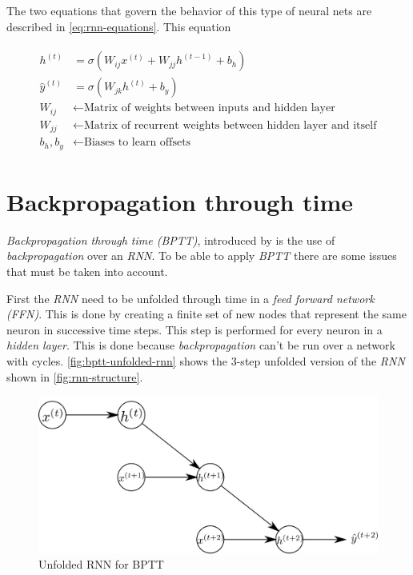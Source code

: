 The two equations that govern the behavior of this type of neural nets
are described in \autoref{eq:rnn-equations}. This equation

\begin{align}
  \begin{split}
    \label{eq:rnn-equations}
    h^{(t)} & = \sigma(W_{ij} x^{(t)} + W_{jj} h^{(t-1)} + b_h ) \\
    \hat{y}^{(t)} & = \sigma(W_{jk} h^{(t)} + b_y ) \\
    W_{ij} & \gets \text{Matrix of weights between inputs and hidden
      layer} \\
    W_{jj} & \gets \text{Matrix of recurrent weights between hidden
      layer and itself} \\
    b_h, b_y & \gets \text{Biases to learn offsets}
  \end{split}
\end{align}

\section{Backpropagation through time}
\label{sec:bp-through-time}

\textit{Backpropagation through time (BPTT)}, introduced by
\cite{werbos1990backpropagation} is the use of
\textit{backpropagation} over an \textit{RNN}. To be able to apply
\textit{BPTT} there are some issues that must be taken into account.

First the \textit{RNN} need to be unfolded through time in a
\textit{feed forward network (FFN)}. This is done by creating a finite
set of new nodes that represent the same neuron in successive time
steps. This step is performed for every neuron in a \textit{hidden
layer}. This is done because \textit{backpropagation} can't be run
over a network with cycles. \autoref{fig:bptt-unfolded-rnn} shows the
3-step unfolded version of the \textit{RNN} shown in
\autoref{fig:rnn-structure}.

\begin{figure}[bth]
  \centering
  \includegraphics[width=.95\linewidth]{gfx/bptt-unfolded-rnn}
  \caption{Unfolded RNN for BPTT}
  \label{fig:bptt-unfolded-rnn}
\end{figure}

